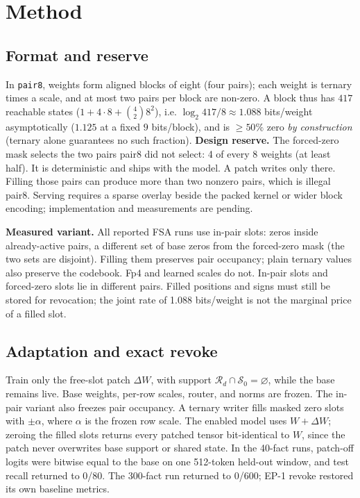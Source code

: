 \documentclass[11pt]{article}
\newcommand{\Sz}{\mathcal{S}_0}
\newcommand{\Rd}{\mathcal{R}_d}
\begin{document}
\section{Method}
\subsection{Format and reserve}
In \texttt{pair8}, weights form aligned blocks of eight (four pairs); each weight is ternary times a scale,
and at most two pairs per block are non-zero. A block thus has $417$ reachable states
($1 + 4\!\cdot\!8 + \binom{4}{2}8^2$), i.e. $\log_2 417/8 \approx 1.088$ bits/weight asymptotically
($1.125$ at a fixed $9$ bits/block), and is $\ge 50\%$ zero \emph{by construction} (ternary alone
guarantees no such fraction). \textbf{Design reserve.} The forced-zero mask selects the two pairs
pair8 did not select: 4 of every 8 weights (at least half). It is deterministic and ships with the
model. A patch writes only there. Filling those pairs can produce more than two nonzero pairs,
which is illegal pair8. Serving requires a sparse overlay beside the packed kernel or wider block
encoding; implementation and measurements are pending.

\textbf{Measured variant.} All reported FSA runs use in-pair slots: zeros inside already-active
pairs, a different set of base zeros from the forced-zero mask (the two sets are disjoint). Filling them preserves pair occupancy;
plain ternary values also preserve the codebook. Fp4 and learned scales do not. In-pair slots and
forced-zero slots lie in different pairs. Filled positions and signs must still be stored for
revocation; the joint rate of 1.088 bits/weight is not the marginal price of a filled slot.

\subsection{Adaptation and exact revoke}
Train only the free-slot patch $\Delta W$, with support $\Rd\cap\Sz=\varnothing$, while the base
remains live. Base weights, per-row scales, router, and norms are frozen. The in-pair variant also
freezes pair occupancy. A ternary writer fills masked zero slots with $\pm\alpha$, where $\alpha$ is the frozen row scale. The enabled
model uses $W+\Delta W$; zeroing the filled slots returns every patched tensor bit-identical to $W$,
since the patch never overwrites base support or shared state. In the 40-fact runs, patch-off logits were
bitwise equal to the base on one 512-token held-out window, and test recall returned to 0/80.
The 300-fact run returned to 0/600; EP-1 revoke restored its own baseline metrics.
\end{document}
